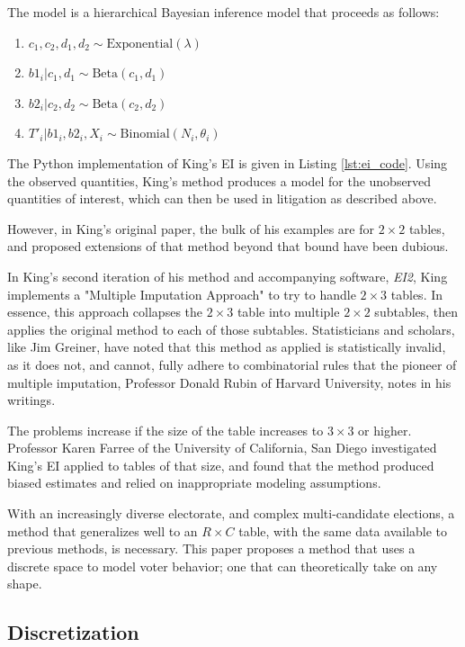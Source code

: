 \documentclass[fleqn,10pt]{style}
\begin{document}
The model is a hierarchical Bayesian inference model that proceeds as follows:

\begin{enumerate}
 \item $c_1, c_2, d_1, d_2 \sim \text{Exponential}(\lambda)$
 \item $b1_i | c_1, d_1 \sim \text{Beta}(c_1, d_1)$
 \item $b2_i | c_2, d_2 \sim \text{Beta}(c_2, d_2)$
 \item $T'_i | b1_i, b2_i, X_i \sim \text{Binomial}(N_i, \theta_i)$
\end{enumerate}

The Python implementation of King's EI is given in Listing \ref{lst:ei_code}. Using the observed quantities, King's method produces a model for the unobserved quantities of interest, which can then be used in litigation as described above.

However, in King's original paper, the bulk of his examples are for $2 \times 2$ tables, and proposed extensions of that method beyond that bound have been dubious.

In King's second iteration of his method and accompanying software, \textit{EI2}, King implements a "Multiple Imputation Approach" to try to handle $2 \times 3$ tables. In essence, this approach collapses the $2 \times 3$ table into multiple $2 \times 2$ subtables, then applies the original method to each of those subtables.\cite{king2013} Statisticians and scholars, like Jim Greiner, have noted that this method as applied is statistically invalid, as it does not, and cannot, fully adhere to combinatorial rules that the pioneer of multiple imputation, Professor Donald Rubin of Harvard University, notes in his writings.\cite{rubin}

The problems increase if the size of the table increases to $3 \times 3$ or higher. Professor Karen Farree of the University of California, San Diego investigated King's EI applied to tables of that size, and found that the method produced biased estimates and relied on inappropriate modeling assumptions.\cite{ferree}

With an increasingly diverse electorate, and complex multi-candidate elections, a method that generalizes well to an $R \times C$ table, with the same data available to previous methods, is necessary. This paper proposes a method that uses a discrete space to model voter behavior; one that can theoretically take on any shape.

\subsection{Discretization}
\end{document}
